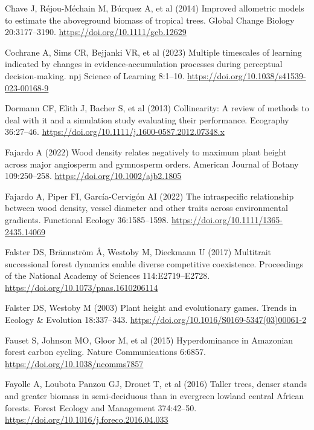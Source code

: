 \documentclass[
  12pt,
  letterpaper,
  DIV=11,
  numbers=noendperiod]{scrartcl}
\newlength{\cslhangindent}
\newlength{\cslentryspacingunit} %
\newenvironment{CSLReferences}[2] %
 {%
  \setlength{\parindent}{0pt}
  \ifodd #1
  \let\oldpar\par
  \def\par{\hangindent=\cslhangindent\oldpar}
  \fi
  \setlength{\parskip}{#2\cslentryspacingunit}
 }%
 {}
\begin{document}
\begin{CSLReferences}{1}{0}
\leavevmode{}%
Chave J, Réjou-Méchain M, Búrquez A, et al (2014) Improved allometric
models to estimate the aboveground biomass of tropical trees. Global
Change Biology 20:3177--3190. \url{https://doi.org/10.1111/gcb.12629}

\leavevmode{}%
Cochrane A, Sims CR, Bejjanki VR, et al (2023) Multiple timescales of
learning indicated by changes in evidence-accumulation processes during
perceptual decision-making. npj Science of Learning 8:1--10.
\url{https://doi.org/10.1038/s41539-023-00168-9}

\leavevmode{}%
Dormann CF, Elith J, Bacher S, et al (2013) Collinearity: A review of
methods to deal with it and a simulation study evaluating their
performance. Ecography 36:27--46.
\url{https://doi.org/10.1111/j.1600-0587.2012.07348.x}

\leavevmode{}%
Fajardo A (2022) Wood density relates negatively to maximum plant height
across major angiosperm and gymnosperm orders. American Journal of
Botany 109:250--258. \url{https://doi.org/10.1002/ajb2.1805}

\leavevmode{}%
Fajardo A, Piper FI, García-Cervigón AI (2022) The intraspecific
relationship between wood density, vessel diameter and other traits
across environmental gradients. Functional Ecology 36:1585--1598.
\url{https://doi.org/10.1111/1365-2435.14069}

\leavevmode{}%
Falster DS, Brännström Å, Westoby M, Dieckmann U (2017) Multitrait
successional forest dynamics enable diverse competitive coexistence.
Proceedings of the National Academy of Sciences 114:E2719--E2728.
\url{https://doi.org/10.1073/pnas.1610206114}

\leavevmode{}%
Falster DS, Westoby M (2003) Plant height and evolutionary games. Trends
in Ecology \& Evolution 18:337--343.
\url{https://doi.org/10.1016/S0169-5347(03)00061-2}

\leavevmode{}%
Fauset S, Johnson MO, Gloor M, et al (2015) Hyperdominance in
{Amazonian} forest carbon cycling. Nature Communications 6:6857.
\url{https://doi.org/10.1038/ncomms7857}

\leavevmode{}%
Fayolle A, Loubota Panzou GJ, Drouet T, et al (2016) Taller trees,
denser stands and greater biomass in semi-deciduous than in evergreen
lowland central {African} forests. Forest Ecology and Management
374:42--50. \url{https://doi.org/10.1016/j.foreco.2016.04.033}


\end{CSLReferences}
\end{document}
